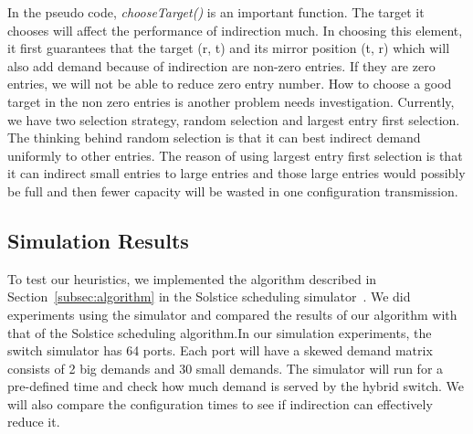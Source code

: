 In the pseudo code, \emph{chooseTarget()} is an important function. The target it chooses will affect the performance of indirection much. In choosing this element, it first guarantees that the target (r, t) and its mirror position (t, r) which will also add demand because of indirection are non-zero entries. If they are zero entries, we will not be able to reduce zero entry number. How to choose a good target in the non zero entries is another problem needs investigation. Currently, we have two selection strategy, random selection and largest entry first selection. The thinking behind random selection is that it can best indirect demand uniformly to other entries. The reason of using largest entry first selection is that it can indirect small entries to large entries and those large entries would possibly be full and then fewer capacity will be wasted in one configuration transmission.


\subsection{Simulation Results}
To test our heuristics, we implemented the algorithm described in Section~\ref{subsec:algorithm} in the Solstice scheduling simulator~\cite{Liu:2014}. We did experiments using the simulator and compared the results of our algorithm with that of the Solstice scheduling algorithm.In our simulation experiments, the switch simulator has 64 ports. Each port will have a skewed demand matrix consists of 2 big demands and 30 small demands. The simulator will run for a pre-defined time and check how much demand is served by the hybrid switch. We will also compare the configuration times to see if indirection can effectively reduce it.

